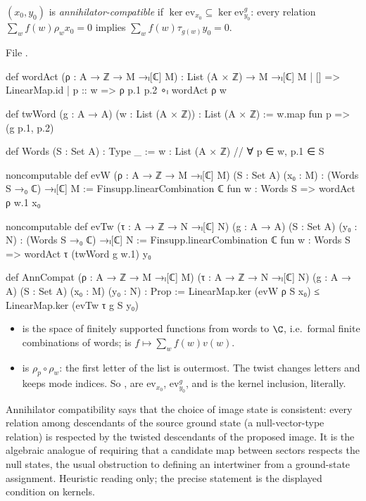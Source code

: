\begin{definition}\label{ch12:def:anncompat}
$(x_0,y_0)$ is \emph{annihilator-compatible} if $\ker\mathrm{ev}_{x_0}\subseteq\ker\mathrm{ev}^g_{y_0}$: every
relation $\sum_wf(w)\rho_wx_0=0$ implies $\sum_wf(w)\tau_{g(w)}y_0=0$.
\end{definition}
File .
\begin{leancode}
def wordAct (ρ : A → ℤ → M →ₗ[ℂ] M) : List (A × ℤ) → M →ₗ[ℂ] M
  | [] => LinearMap.id
  | p :: w => ρ p.1 p.2 ∘ₗ wordAct ρ w

def twWord (g : A → A) (w : List (A × ℤ)) : List (A × ℤ) := w.map fun p => (g p.1, p.2)

def Words (S : Set A) : Type _ := {w : List (A × ℤ) // ∀ p ∈ w, p.1 ∈ S}

noncomputable def evW (ρ : A → ℤ → M →ₗ[ℂ] M) (S : Set A) (x₀ : M) : (Words S →₀ ℂ) →ₗ[ℂ] M :=
  Finsupp.linearCombination ℂ fun w : Words S => wordAct ρ w.1 x₀

noncomputable def evTw (τ : A → ℤ → N →ₗ[ℂ] N) (g : A → A) (S : Set A) (y₀ : N) :
    (Words S →₀ ℂ) →ₗ[ℂ] N :=
  Finsupp.linearCombination ℂ fun w : Words S => wordAct τ (twWord g w.1) y₀

def AnnCompat (ρ : A → ℤ → M →ₗ[ℂ] M) (τ : A → ℤ → N →ₗ[ℂ] N) (g : A → A) (S : Set A)
    (x₀ : M) (y₀ : N) : Prop :=
  LinearMap.ker (evW ρ S x₀) ≤ LinearMap.ker (evTw τ g S y₀)
\end{leancode}
\begin{dictionary}
\begin{itemize}
\item {} is the space of finitely supported functions from words to $\C$, i.e.\ formal
  finite combinations of words;  is $f\mapsto\sum_wf(w)v(w)$.
\item {} is $\rho_p\circ\rho_w$: the first letter of the list is outermost.  The
  twist changes letters and keeps mode indices.  So ,  are $\mathrm{ev}_{x_0}$,
  $\mathrm{ev}^g_{y_0}$, and  is the kernel inclusion, literally.
\end{itemize}
\end{dictionary}

\begin{physics}
Annihilator compatibility says that the choice of image state is consistent: every relation among descendants of the source ground state (a null-vector-type relation) is respected by the twisted descendants of the proposed image. It is the algebraic analogue of requiring that a candidate map between sectors respects the null states, the usual obstruction to defining an intertwiner from a ground-state assignment. Heuristic reading only; the precise statement is the displayed condition on kernels.
\end{physics}

